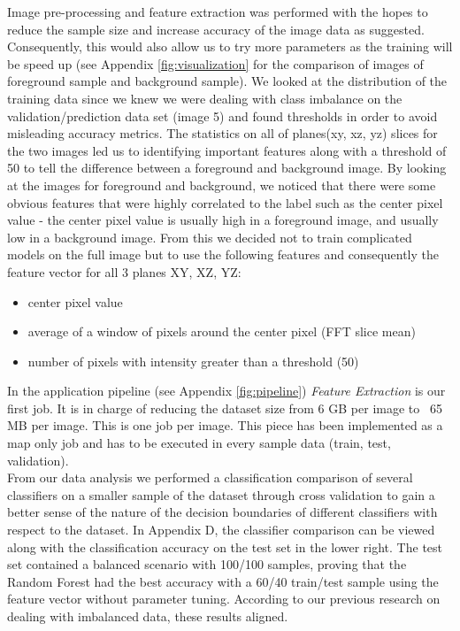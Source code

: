 \documentclass{neu_handout}
\begin{document}
Image pre-processing and feature extraction was performed with the hopes to reduce the sample size and increase accuracy of the image data as suggested. Consequently, this would also allow us to try more parameters as the training will be speed up (see Appendix \ref{fig:visualization} for the comparison of images of foreground sample and background sample). We looked at the distribution of the training data since we knew we were dealing with class imbalance on the validation/prediction data set (image 5) and found thresholds in order to avoid misleading accuracy metrics. The statistics on all of planes(xy, xz, yz) slices for the two images led us to identifying important features along with a threshold of 50 to tell the difference between a foreground and background image. By looking at the images for foreground and background, we noticed that there were some obvious features that were highly correlated to the label such as the center pixel value - the center pixel value is usually high in a foreground image, and usually low in a background image. From this we decided not to train complicated models on the full image but to use the following features and consequently the feature vector for all 3 planes XY, XZ, YZ:

\begin{itemize}
\setlength\itemsep{0.2em}
\item center pixel value
\item average of a window of pixels around the center pixel (FFT slice mean)
\item number of pixels with intensity greater than a threshold (50)
\end{itemize}

In the application pipeline (see Appendix \ref{fig:pipeline}) \textit{Feature Extraction} is our first job. It is in charge of reducing the dataset size from 6 GB per image to ~65 MB per image. This is one job per image. This piece has been implemented as a map only job and has to be executed in every sample data (train, test, validation). \\

From our data analysis we performed a classification comparison \cite{compare} of several classifiers on a smaller sample of the dataset through cross validation to gain a better sense of the nature of the decision boundaries of different classifiers with respect to the dataset. In Appendix D, the classifier comparison can be viewed along with the classification accuracy on the test set in the lower right. The test set contained a balanced scenario with 100/100 samples, proving that the Random Forest had the best accuracy with a 60/40 train/test sample using the feature vector without parameter tuning. According to our previous research on dealing with imbalanced data, these results aligned.
\end{document}
